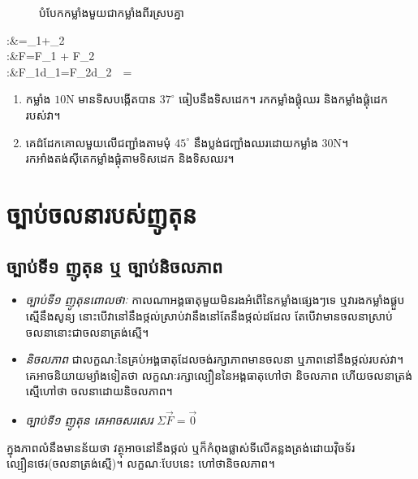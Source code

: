 \begin{enumerate}
\begin{figure}[H]
		\caption{បំបែកកម្លាំងមួយជាកម្លាំងពីរស្របគ្នា}
	\end{figure}
	\begin{flalign*}
		\quad :&\quad {}=_{1}+_{2}\\
		\quad :&\quad F=F_{1} + F_{2}\\
		\quad :&\quad F_{1}\times d_{1}=F_{2}\times d_{2}~~=
	\end{flalign*}
\end{enumerate}
\begin{exercise}
	\begin{enumerate}
		\item កម្លាំង $10\si{\newton}$ មានទិសបង្កើតបាន $37^\circ$ ធៀបនឹងទិសដេក។ រកកម្លាំងផ្គុំឈរ និងកម្លាំងផ្គុំដេករបស់វា។
		\item គេដំដែកគោលមួយលើជញ្ជាំងតាមមុំ $45^\circ$ នឹងប្លង់ជញ្ជាំងឈរដោយកម្លាំង $30\si{\newton}$។\\
		រកអាំងតង់ស៊ីតេកម្លាំងផ្គុំតាមទិសដេក និងទិសឈរ។
	\end{enumerate}
\end{exercise}
\section{ច្បាប់ចលនារបស់ញូតុន}
\subsection{ច្បាប់ទី១ ញូតុន ឬ ច្បាប់និចលភាព}
\begin{itemize}
	\item \emph{\kml ច្បាប់ទី១ ញូតុនពោលថាៈ} កាលណាអង្គធាតុមួយមិនរងអំពើនៃកម្លាំងផ្សេងៗទេ ឬវារងកម្លាំងផ្គួបស្មើនឹងសូន្យ នោះបើវានៅនឹងថ្កល់ស្រាប់វានឹងនៅតែនឹងថ្កល់ដដែល តែបើវាមានចលនាស្រាប់ ចលនានោះជាចលនាត្រង់ស្មើ។
	\item \emph{\kml និចលភាព} ជាលក្ខណៈនៃគ្រប់អង្គធាតុដែលចង់រក្សាភាពមានចលនា ឬភាពនៅនឹងថ្កល់របស់វា។ គេអាចនិយាយម្យ៉ាងទៀតថា លក្ខណៈរក្សាល្បឿននៃអង្គធាតុហៅថា និចលភាព ហើយចលនាត្រង់ស្មើហៅថា ចលនាដោយនិចលភាព។
	\item \emph{\kml ច្បាប់ទី១ ញូតុន គេអាចសរសេរ} $\Sigma \overrightarrow{F}=\overrightarrow{0}$
\end{itemize}
\begin{remark}
	ក្នុងភាពលំនឹងមានន័យថា វត្ថុអាចនៅនឹងថ្កល់ ឬក៏កំពុងផ្លាស់ទីលើគន្លងត្រង់ដោយវ៉ិចទ័រល្បឿនថេរ(ចលនាត្រង់ស្មើ)។ លក្ខណៈបែបនេះ ហៅថានិចលភាព។
\end{remark}
